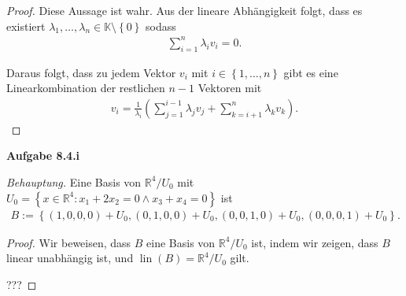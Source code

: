 \documentclass[12pt]{extarticle}
\newcommand{\mg}[1]{\mathbb{#1}}
\newcommand{\lin}{\operatorname{lin}}
\begin{document}
\begin{proof}
  Diese Aussage ist wahr.  Aus der lineare Abhängigkeit
  folgt, dass es existiert
  $\lambda_1, \ldots, \lambda_n \in \mg{K} \setminus
  \left\{ 0 \right\}$ sodass
\begin{align*}
\sum_{i=1}^n{\lambda_iv_i}=0.
\end{align*}

Daraus folgt, dass zu jedem Vektor \(v_i\) mit $i \in
\left\{ 1, \ldots, n \right\}$ gibt es eine
Linearkombination der restlichen \(n-1\) Vektoren mit
\begin{align*}
v_i = \frac{1}{\lambda_i} \left(
  \sum_{j=1}^{i-1}{\lambda_jv_j} + \sum_{k=i+1}^n{\lambda_kv_k} \right).
\end{align*}
\end{proof}

\textbf{Aufgabe 8.4.i}

\textit{Behauptung.}  Eine Basis von \(\mg{R}^4/U_0\) mit
$U_0= \left\{ x \in \mg{R}^4 \colon x_1+2x_2 = 0 \wedge
  x_3 + x_4 = 0\right\}$ ist
\begin{align*}
B := \left\{ \left( 1, 0, 0, 0
  \right) + U_0, \left( 0, 1, 0, 0 \right) + U_0,
  \left( 0, 0, 1, 0 \right) + U_0, \left( 0, 0, 0, 1
  \right) + U_0 \right\}.
\end{align*}

\begin{proof}
Wir beweisen, dass \(B\) eine Basis von \(\mg{R}^4/U_0\)
ist, indem wir zeigen, dass \(B\) linear unabhängig ist,
und \(\lin(B) = \mg{R}^4/U_0\) gilt.

???
\end{proof}
\end{document}
